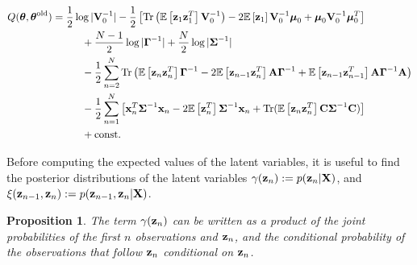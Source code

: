 \documentclass[11pt]{article}
\newtheorem{proposition}{Proposition}[section]
\begin{document}
\begin{align}
	Q(\boldsymbol\theta, \boldsymbol\theta^\text{old}) &= \frac{1}{2}\log \vert
	  {\bf V}_0^{-1}\vert -\frac{1}{2}\left[\text{Tr}\left(\mathbb{E}\left[{\bf z}_1 {\bf z}_1^T\right] {\bf V}_0^{-1}\right) -2 \mathbb{E}\left[{\bf z}_1\right]{\bf V}_0^{-1}\boldsymbol\mu_0 + \boldsymbol\mu_0 {\bf V}_0^{-1}\boldsymbol\mu_0^T\right] \nonumber \\
	  &\hspace{1cm}+ \frac{N-1}{2}\log\vert\boldsymbol\Gamma^{-1}\vert + \frac{N}{2}\log\vert \boldsymbol\Sigma^{-1}\vert \nonumber \\
	  &\hspace{1cm}-\frac{1}{2} \sum_{n=2}^{N}\text{Tr}\left(\mathbb{E}\left[{\bf z}_n{\bf z}_n^T\right]\boldsymbol\Gamma^{-1} -2\mathbb{E}\left[ {\bf z}_{n-1}{\bf z}_n^T\right]{\bf A}\boldsymbol\Gamma^{-1} + \mathbb{E}\left[{\bf z}_{n-1}{\bf z}_{n-1}^T\right]{\bf A}\boldsymbol\Gamma^{-1}{\bf A}\right) \nonumber\\
	  &\hspace{1cm}-\frac{1}{2}\sum_{n=1}^N\left[{\bf x}_n^T\boldsymbol{\Sigma}^{-1}{\bf x}_n-2\mathbb{E}\left[{\bf z}_n^T\right]\boldsymbol\Sigma^{-1}{\bf x}_n + \text{Tr}(\mathbb{E}\left[{\bf z}_n{\bf z}_n^T\right]{\bf C}\boldsymbol\Sigma^{-1}{\bf C})\right] \nonumber\\
	  &\hspace{1cm} + \text{const.}
\end{align}

Before computing the expected values of the latent variables, it is useful to find the posterior distributions of the latent variables $\gamma({\bf z}_n) := p({\bf z}_n\vert {\bf X})$, and $\xi({\bf z}_{n-1}, {\bf z}_{n}) := p({\bf z}_{n-1}, {\bf z}_n\vert {\bf X})$. %

\begin{proposition}
	The term $\gamma({\bf z}_n)$ can be written as a product of the joint probabilities of the first $n$ observations and ${\bf z}_n$, and the conditional probability of the observations that follow ${\bf z}_n$ conditional on ${\bf z}_n$.
\end{proposition}
\end{document}
